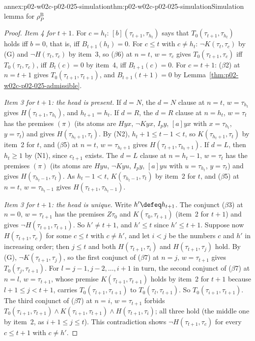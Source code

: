 \begin{annexitem}{annex:p02-w02c-p02-025-simulation}{thm:p02-w02c-p02-025-simulation}{Simulation lemma for \(\rho^{\mathrm B}_P\)}
\begin{proof}
\emph{Item 4 for \(t+1\).}  For \(c=h_t\): \([b](\tau_{t+1},\tau_{h_t})\) says
that \(T_0(\tau_{t+1},\tau_{h_t})\) holds iff \(b=0\), that is, iff
\(B_{t+1}(h_t)=0\).  For \(c\leq t\) with \(c\neq h_t\): \(\neg K(\tau_t,\tau_c)\)
by (G) and \(\neg H(\tau_t,\tau_c)\) by item~3, so (\(\beta\)6) at \(n=t\),
\(w=\tau_c\) gives \(T_0(\tau_{t+1},\tau_c)\) iff \(T_0(\tau_t,\tau_c)\), iff
\(B_t(c)=0\) by item~4, iff \(B_{t+1}(c)=0\).  For \(c=t+1\): (\(\beta\)2) at
\(n=t+1\) gives \(T_0(\tau_{t+1},\tau_{t+1})\), and \(B_{t+1}(t+1)=0\) by
Lemma~\ref{thm:p02-w02c-p02-025-admissible}.

\emph{Item 3 for \(t+1\): the head is present.}  If \(d=N\), the \(d=N\) clause
at \(n=t\), \(w=\tau_{h_t}\) gives \(H(\tau_{t+1},\tau_{h_t})\), and
\(h_{t+1}=h_t\).  If \(d=R\), the \(d=R\) clause at \(n=h_t\), \(w=\tau_t\) has the
premises \((\pi)\) (its atoms are \(Hyx\), \(\neg Kyx\), \(I_py\), \([a]yx\) with
\(x=\tau_{h_t}\), \(y=\tau_t\)) and gives \(H(\tau_{h_t+1},\tau_t)\).  By (N2),
\(h_t+1\leq t-1<t\), so \(K(\tau_{h_t+1},\tau_t)\) by item~2 for \(t\), and
(\(\beta\)5) at \(n=t\), \(w=\tau_{h_t+1}\) gives
\(H(\tau_{t+1},\tau_{h_t+1})\).  If \(d=L\), then \(h_t\geq1\) by (N1), since
\(c_{t+1}\) exists.  The \(d=L\) clause at \(n=h_t-1\), \(w=\tau_t\) has the
premises \((\pi)\) (its atoms are \(Hyu\), \(\neg Kyu\), \(I_py\), \([a]yu\) with
\(u=\tau_{h_t}\), \(y=\tau_t\)) and gives \(H(\tau_{h_t-1},\tau_t)\).  As
\(h_t-1<t\), \(K(\tau_{h_t-1},\tau_t)\) by item~2 for \(t\), and (\(\beta\)5) at
\(n=t\), \(w=\tau_{h_t-1}\) gives \(H(\tau_{t+1},\tau_{h_t-1})\).

\emph{Item 3 for \(t+1\): the head is unique.}  Write \(h'\defeq h_{t+1}\).  The
conjunct (\(\beta\)3) at \(n=0\), \(w=\tau_{t+1}\) has the premises
\(Z\tau_0\) and \(K(\tau_0,\tau_{t+1})\) (item~2 for \(t+1\)) and gives
\(\neg H(\tau_{t+1},\tau_{t+1})\).  So \(h'\neq t+1\), and \(h'\leq t\) since
\(h'\leq t+1\).  Suppose now \(H(\tau_{t+1},\tau_c)\) for some \(c\leq t\) with
\(c\neq h'\), and let \(i<j\) be the numbers \(c\) and \(h'\) in increasing order;
then \(j\leq t\) and both \(H(\tau_{t+1},\tau_i)\) and \(H(\tau_{t+1},\tau_j)\)
hold.  By (G), \(\neg K(\tau_{t+1},\tau_j)\), so the first conjunct of
(\(\beta\)7) at \(n=j\), \(w=\tau_{t+1}\) gives \(T_0(\tau_j,\tau_{t+1})\).  For
\(l=j-1,j-2,\ldots,i+1\) in turn, the second conjunct of (\(\beta\)7) at \(n=l\),
\(w=\tau_{t+1}\), whose premise \(K(\tau_{l+1},\tau_{t+1})\) holds by item~2 for
\(t+1\) because \(l+1\leq j<t+1\), carries \(T_0(\tau_{l+1},\tau_{t+1})\) to
\(T_0(\tau_l,\tau_{t+1})\).  So \(T_0(\tau_{i+1},\tau_{t+1})\).  The third
conjunct of (\(\beta\)7) at \(n=i\), \(w=\tau_{t+1}\) forbids
\(T_0(\tau_{i+1},\tau_{t+1})\land K(\tau_{i+1},\tau_{t+1})\land
H(\tau_{t+1},\tau_i)\); all three hold (the middle one by item~2, as
\(i+1\leq j\leq t\)).  This contradiction shows \(\neg H(\tau_{t+1},\tau_c)\) for
every \(c\leq t+1\) with \(c\neq h'\).
\end{proof}
\end{annexitem}

